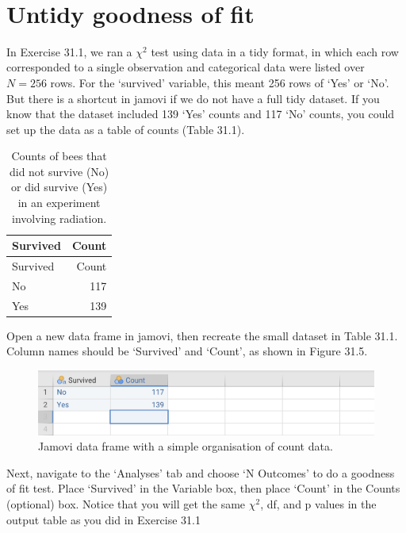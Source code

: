 \documentclass[
  openany]{scrbook}
\begin{document}
\begin{verbatim}


\end{verbatim}

\hypertarget{untidy-goodness-of-fit}{%
\section{Untidy goodness of fit}\label{untidy-goodness-of-fit}}

In Exercise 31.1, we ran a \(\chi^{2}\) test using data in a tidy format, in which each row corresponded to a single observation and categorical data were listed over \(N = 256\) rows.
For the `survived' variable, this meant 256 rows of `Yes' or `No'.
But there is a shortcut in jamovi if we do not have a full tidy dataset.
If you know that the dataset included 139 `Yes' counts and 117 `No' counts, you could set up the data as a table of counts (Table 31.1).

\begin{longtable}[]{@{}lr@{}}
\caption{\label{tab:unnamed-chunk-136}Counts of bees that did not survive (No) or did survive (Yes) in an experiment involving radiation.}\tabularnewline
\toprule
Survived & Count \\
\midrule
\endfirsthead
\toprule
Survived & Count \\
\midrule
\endhead
No & 117 \\
Yes & 139 \\
\bottomrule
\end{longtable}

Open a new data frame in jamovi, then recreate the small dataset in Table 31.1.
Column names should be `Survived' and `Count', as shown in Figure 31.5.

\begin{figure}
\includegraphics[width=1\linewidth]{img/jamovi_simple_counts} \caption{Jamovi data frame with a simple organisation of count data.}\label{fig:unnamed-chunk-137}
\end{figure}

Next, navigate to the `Analyses' tab and choose `N Outcomes' to do a goodness of fit test.
Place `Survived' in the Variable box, then place `Count' in the Counts (optional) box.
Notice that you will get the same \(\chi^{2}\), df, and p values in the output table as you did in Exercise 31.1
\end{document}

